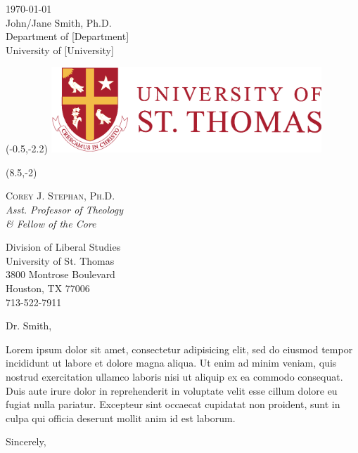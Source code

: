 \documentclass[letterpaper,12pt]{letter}
\date{}
\begin{document}
\begin{letter}{
	\today \\\bigskip %
	John/Jane Smith, Ph.D. \\
	Department of [Department] \\
	University of [University]
}
                           
\begin{textblock}{4}(-0.5,-2.2)
\noindent
\hspace*{-0.35cm}\includegraphics[width=4in]{img/ust-logo.eps}
\end{textblock}

{
	\footnotesize %
	\usttext\begin{textblock}{3}(8.5,-2) %
		{
			\color{ustred}
			\noindent
			\textsc{Corey J. Stephan, Ph.D.}\\
			\emph{Asst. Professor of Theology \\ \& Fellow of the Core}
			
			Division of Liberal Studies \\			
			University of St. Thomas \\
			3800 Montrose Boulevard \\
			Houston, TX 77006 \\
			713-522-7911
		}
	\end{textblock}
}

	\opening{Dr. Smith,}

Lorem ipsum dolor sit amet, consectetur adipisicing elit, sed do eiusmod tempor incididunt ut labore et dolore magna aliqua. Ut enim ad minim veniam, quis nostrud exercitation ullamco laboris nisi ut aliquip ex ea commodo consequat. Duis aute irure dolor in reprehenderit in voluptate velit esse cillum dolore eu fugiat nulla pariatur. Excepteur sint occaecat cupidatat non proident, sunt in culpa qui officia deserunt mollit anim id est laborum.


\closing{\vspace{1cm}Sincerely,}
\end{letter}
\end{document}
